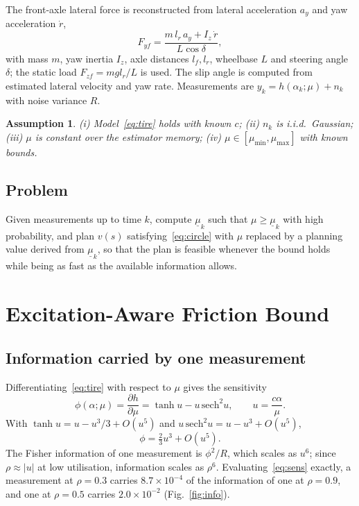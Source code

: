 \documentclass[letterpaper,journal,twoside]{IEEEtran}%
\newtheorem{assumption}{Assumption}
\newcommand{\mulb}{\underline{\mu}}
\begin{document}
The front-axle lateral force is reconstructed from lateral acceleration $a_y$ and yaw acceleration $\dot r$,
\begin{equation}
F_{yf}=\frac{m\,l_r\,a_y+I_z\,\dot r}{L\cos\delta}, \label{eq:force}
\end{equation}
with mass $m$, yaw inertia $I_z$, axle distances $l_f,l_r$, wheelbase $L$ and steering angle $\delta$; the static load $F_{zf}=mgl_r/L$ is used. The slip angle is computed from estimated lateral velocity and yaw rate. Measurements are $y_k=h(\alpha_k;\mu)+n_k$ with noise variance $R$.

\begin{assumption}\label{as:model}
(i) Model~\eqref{eq:tire} holds with known $c$; (ii) $n_k$ is i.i.d.\ Gaussian; (iii) $\mu$ is constant over the estimator memory; (iv) $\mu\in[\mu_{\min},\mu_{\max}]$ with known bounds.
\end{assumption}

\subsection{Problem}
Given measurements up to time $k$, compute $\mulb_k$ such that $\mu\ge\mulb_k$ with high probability, and plan $v(s)$ satisfying~\eqref{eq:circle} with $\mu$ replaced by a planning value derived from $\mulb_k$, so that the plan is feasible whenever the bound holds while being as fast as the available information allows.

\section{Excitation-Aware Friction Bound}
\subsection{Information carried by one measurement}
Differentiating~\eqref{eq:tire} with respect to $\mu$ gives the sensitivity
\begin{equation}
\phi(\alpha;\mu)=\frac{\partial h}{\partial\mu}=\tanh u-u\,\mathrm{sech}^2u,\qquad u=\frac{c\alpha}{\mu}. \label{eq:sens}
\end{equation}
With $\tanh u=u-u^3/3+O(u^5)$ and $u\,\mathrm{sech}^2u=u-u^3+O(u^5)$,
\begin{equation}
\phi=\tfrac{2}{3}u^3+O(u^5). \label{eq:series}
\end{equation}
The Fisher information of one measurement is $\phi^2/R$, which scales as $u^6$; since $\rho\approx|u|$ at low utilisation, information scales as $\rho^6$. Evaluating~\eqref{eq:sens} exactly, a measurement at $\rho=0.3$ carries $8.7\times10^{-4}$ of the information of one at $\rho=0.9$, and one at $\rho=0.5$ carries $2.0\times10^{-2}$ (Fig.~\ref{fig:info}).
\end{document}
